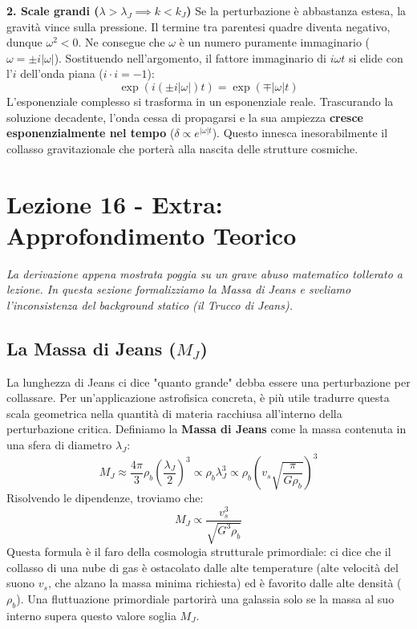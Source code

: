 \documentclass[11pt,a4paper]{report}
\begin{document}
\textbf{2. Scale grandi ($\lambda > \lambda_J \implies k < k_J$)}
Se la perturbazione è abbastanza estesa, la gravità vince sulla pressione. Il termine tra parentesi quadre diventa negativo, dunque $\omega^2 < 0$. Ne consegue che $\omega$ è un numero puramente immaginario ($\omega = \pm i|\omega|$).
Sostituendo nell'argomento, il fattore immaginario di $i\omega t$ si elide con l'$i$ dell'onda piana ($i \cdot i = -1$):
\begin{equation}
\exp(i(\pm i|\omega|)t) = \exp(\mp |\omega| t)
\end{equation}
L'esponenziale complesso si trasforma in un esponenziale reale. Trascurando la soluzione decadente, l'onda cessa di propagarsi e la sua ampiezza \textbf{cresce esponenzialmente nel tempo} ($\delta \propto e^{|\omega|t}$). Questo innesca inesorabilmente il collasso gravitazionale che porterà alla nascita delle strutture cosmiche.

\newpage
\section{Lezione 16 - Extra: Approfondimento Teorico}

\textit{La derivazione appena mostrata poggia su un grave abuso matematico tollerato a lezione. In questa sezione formalizziamo la Massa di Jeans e sveliamo l'inconsistenza del background statico (il Trucco di Jeans).}

\subsection{La Massa di Jeans ($M_J$)}
La lunghezza di Jeans ci dice "quanto grande" debba essere una perturbazione per collassare. Per un'applicazione astrofisica concreta, è più utile tradurre questa scala geometrica nella quantità di materia racchiusa all'interno della perturbazione critica. Definiamo la \textbf{Massa di Jeans} come la massa contenuta in una sfera di diametro $\lambda_J$:
\begin{equation}
M_J \approx \frac{4\pi}{3} \rho_b \left( \frac{\lambda_J}{2} \right)^3 \propto \rho_b \lambda_J^3 \propto \rho_b \left( v_s \sqrt{\frac{\pi}{G\rho_b}} \right)^3
\end{equation}
Risolvendo le dipendenze, troviamo che:
\begin{equation}
M_J \propto \frac{v_s^3}{\sqrt{G^3 \rho_b}}
\end{equation}
Questa formula è il faro della cosmologia strutturale primordiale: ci dice che il collasso di una nube di gas è ostacolato dalle alte temperature (alte velocità del suono $v_s$, che alzano la massa minima richiesta) ed è favorito dalle alte densità ($\rho_b$). Una fluttuazione primordiale partorirà una galassia solo se la massa al suo interno supera questo valore soglia $M_J$.
\end{document}
